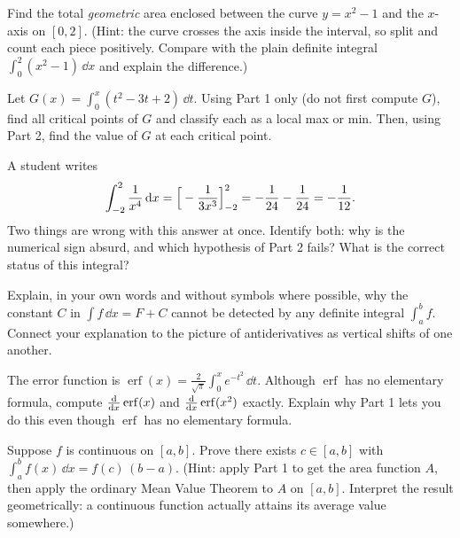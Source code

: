 \begin{exercise}
Find the total \emph{geometric} area enclosed between the curve $y=x^2-1$ and the
$x$-axis on $[0,2]$. (Hint: the curve crosses the axis inside the interval, so
split and count each piece positively. Compare with the plain definite integral
$\int_0^2(x^2-1)\,\dd x$ and explain the difference.)
\end{exercise}

\begin{exercise}
Let $G(x)=\int_0^x (t^2 - 3t + 2)\,\dd t$. Using Part 1 only (do not first compute
$G$), find all critical points of $G$ and classify each as a local max or min.
Then, using Part 2, find the value of $G$ at each critical point.
\end{exercise}

\begin{exercise}[Conceptual]
A student writes
\[
  \int_{-2}^{2}\frac{1}{x^4}\,\mathrm{d} x =
  \Big[-\frac{1}{3x^3}\Big]_{-2}^{2} = -\frac{1}{24}-\frac{1}{24}=-\frac{1}{12}.
\]
Two things are wrong with this answer at once. Identify both: why is the numerical
sign absurd, and which hypothesis of Part 2 fails? What is the correct status of
this integral?
\end{exercise}

\begin{exercise}[Conceptual]
Explain, in your own words and without symbols where possible, why the constant
$C$ in $\int f\,\dd x = F+C$ cannot be detected by any definite integral
$\int_a^b f$. Connect your explanation to the picture of antiderivatives as
vertical shifts of one another.
\end{exercise}

\begin{exercise}
The error function is $\operatorname{erf}(x)=\frac{2}{\sqrt{\pi}}\int_0^x
e^{-t^2}\,\dd t$. Although $\operatorname{erf}$ has no elementary formula, compute
$\frac{\mathrm{d} }{\mathrm{d} x}\operatorname{erf}(x)$ and $\frac{\mathrm{d} }{\mathrm{d} x}\operatorname{erf}(x^2)$ exactly.
Explain why Part 1 lets you do this even though $\operatorname{erf}$ has no
elementary formula.
\end{exercise}

\begin{exercise}
Suppose $f$ is continuous on $[a,b]$. Prove there exists $c\in[a,b]$ with
$\int_a^b f(x)\,\dd x = f(c)\,(b-a)$. (Hint: apply Part 1 to get the area function
$A$, then apply the ordinary Mean Value Theorem to $A$ on $[a,b]$. Interpret the
result geometrically: a continuous function actually attains its average value
somewhere.)
\end{exercise}

